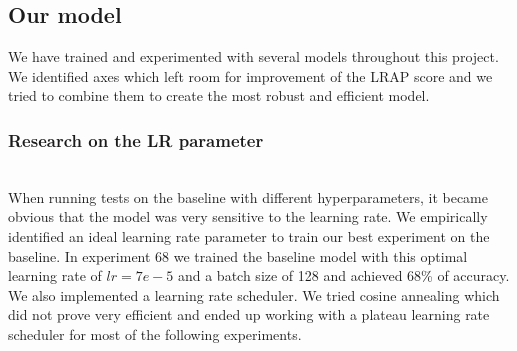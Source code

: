 \subsection*{Our model}
\label{sec:our model}
We have trained and experimented with several models throughout this project. We identified axes which left room for improvement of the LRAP score and we tried to combine them to create the most robust and efficient model. 

\subsubsection*{Research on the LR parameter}
\hfill\\
When running tests on the baseline with different hyperparameters, it became obvious that the model was very sensitive to the learning rate. We empirically identified an ideal learning rate parameter to train our best experiment on the baseline. In experiment 68 we trained the baseline model with this optimal learning rate of $lr=7e-5$ and a batch size of 128 and achieved 68\% of accuracy. 
\newline We also implemented a learning rate scheduler. We tried cosine annealing which did not prove very efficient and ended up working with a plateau learning rate scheduler for most of the following experiments.

